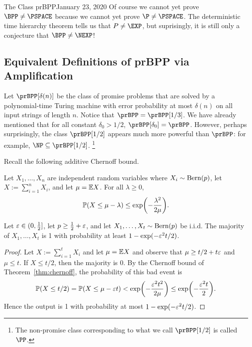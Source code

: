 \begin{lecture}{1}{The Class prBPP}{January 23, 2020}
Of course we cannot yet prove $\BPP \ne \PSPACE$ because we cannot yet prove
$\P \ne \PSPACE$. The deterministic time hierarchy theorem tells us that $P \ne
\EXP$, but suprisingly, it is still only a conjecture that $\BPP \ne \NEXP$!

\subsection{Equivalent Definitions of prBPP via Amplification}

Let $\prBPP[\delta(n)]$ be the class of promise problems that are solved by a
polynomial-time Turing machine with error probability at most $\delta(n)$ on
all input strings of length $n$. Notice that $\prBPP = \prBPP[1/3]$. We have
already mentioned that for all constant $\delta_0 > 1/2$, $\prBPP[\delta_0] =
\prBPP$. However, perhaps surprisingly, the class $\prBPP[1/2]$ appears much
more powerful than $\prBPP$: for example, $\NP \subseteq \prBPP[1/2]$.%
\footnote{The non-promise class corresponding to what we call $\prBPP[1/2]$ is
called $\PP$.}

Recall the following additive Chernoff bound.

\begin{theorem}\label{thm:chernoff}
  Let $X_1, \dots, X_n$ are independent random variables where $X_i \sim
  \operatorname{Bern}(p)$, let $X := \sum_{i=1}^n X_i$, and let $\mu = \mathbb{E} X$. For all
  $\lambda \ge 0$, \[
    \Pr\paren*{X \le \mu - \lambda} \le \exp\paren*{-\frac{\lambda^2}{2\mu}}.
  \]
\end{theorem}

\begin{proposition}
  Let $\varepsilon \in (0, \frac{1}{2}]$, let $p \ge \frac{1}{2} + \varepsilon$, and let $X_1,
  \dots, X_t \sim \operatorname{Bern}(p)$ be i.i.d. The majority of $X_1, \dots, X_t$ is 1
  with probability at least $1 - \exp(-\varepsilon^2 t/2)$.
\end{proposition}

\begin{proof}
  Let $X := \sum_{i=1}^t X_i$ and let $\mu = \mathbb{E} X$ and observe that $\mu \ge
  t/2 + t\varepsilon$ and $\mu \le t$. If $X \le t/2$, then the majority is 0. By the
  Chernoff bound of Theorem~\ref{thm:chernoff}, the probability of this bad
  event is \[
    \Pr(X \le t/2) = \Pr(X \le \mu - \eps t) < \exp\paren*{-\frac{\eps^2t^2}{2\mu}} \le \exp\paren*{-\frac{\eps^2t}{2}}.
  \]
  Hence the output is 1 with probability at most $1 - \exp(-\varepsilon^2 t/2)$.
\end{proof}


\end{lecture}
